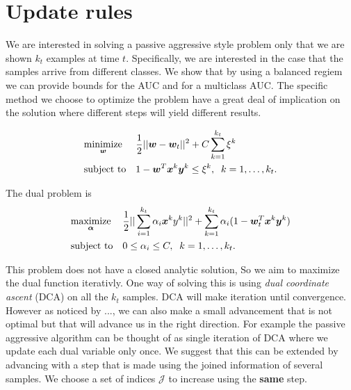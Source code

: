 \section{Update rules}

We are interested in solving a passive aggressive style problem only that we are shown $k_t$ examples at time $t$. Specifically, we are interested in the case that the samples arrive from different classes. We show that by using a balanced regiem we can provide bounds for the AUC and for a multiclass AUC. The specific method we choose to optimize the problem have a great deal of implication on the solution where different steps will yield different results.

\begin{equation*}
\begin{aligned}
& \underset{\bm{w}}{\text{minimize}}
& & \frac{1}{2} || \bm{w} - \bm{w}_t ||^2 + C \sum\limits_{k=1}^{k_t}{\xi^k} \\
& \text{subject to}
& & 1 - \bm{w}^T \bm{x}^k \bm{y}^k \leq \xi^k, \;
 \; k = 1, \ldots, k_t.
\end{aligned}
\end{equation*}


The dual problem is 
\begin{equation*}
\begin{aligned}
& \underset{\bm{\alpha}}{\text{maximize}}
& & \frac{1}{2} || \sum\limits_{i=1}^{k_t} {\alpha_i \bm{x}^k y^k}||^2 + \sum\limits_{k=1}^{k_t} {\alpha_i (1 - \bm{w}_t^T \bm{x}^k \bm{y}^k }) \\
& \text{subject to}
& & 0 \leq \alpha_i \leq C, \;
 \; k = 1, \ldots, k_t.
\end{aligned}
\end{equation*}


This problem does not have a closed analytic solution, So we aim to maximize the dual function iterativly. One way of solving this is using \textit{dual coordinate ascent} (DCA) on all the $k_t$ samples. DCA will make iteration until convergence. However as noticed by ...,  we can also make a small advancement that is not optimal but that will advance us in the right direction. For example the passive aggressive algorithm can be thought of as single iteration of DCA where we update each dual variable only once. We suggest that this can be extended by advancing with a step that is made using the joined information of several samples. We choose a set of indices $\mathcal{J} $ to increase using the \textbf{ same } step.


